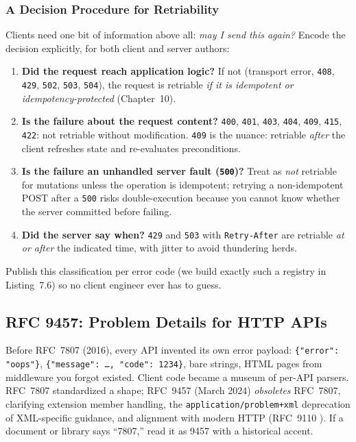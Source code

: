 \subsubsection{A Decision Procedure for Retriability}

Clients need one bit of information above all: \emph{may I send this again?}
Encode the decision explicitly, for both client and server authors:

\begin{enumerate}
  \item \textbf{Did the request reach application logic?} If not (transport
        error, \texttt{408}, \texttt{429}, \texttt{502}, \texttt{503},
        \texttt{504}), the request is retriable \emph{if it is idempotent or
        idempotency-protected} (Chapter~10).
  \item \textbf{Is the failure about the request content?} \texttt{400},
        \texttt{401}, \texttt{403}, \texttt{404}, \texttt{409}, \texttt{415},
        \texttt{422}: not retriable without modification. \texttt{409} is the
        nuance: retriable \emph{after} the client refreshes state and
        re-evaluates preconditions.
  \item \textbf{Is the failure an unhandled server fault (\texttt{500})?}
        Treat as \emph{not} retriable for mutations unless the operation is
        idempotent; retrying a non-idempotent POST after a \texttt{500} risks
        double-execution because you cannot know whether the server
        committed before failing.
  \item \textbf{Did the server say when?} \texttt{429} and \texttt{503} with
        \texttt{Retry-After} are retriable \emph{at or after} the indicated
        time, with jitter to avoid thundering herds.
\end{enumerate}

Publish this classification per error code (we build exactly such a registry
in Listing~7.6) so no client engineer ever has to guess.

\subsection{RFC 9457: Problem Details for HTTP APIs}

Before RFC~7807 (2016), every API invented its own error payload:
\texttt{\{"error": "oops"\}}, \texttt{\{"message": \ldots, "code": 1234\}},
bare strings, HTML pages from middleware you forgot existed. Client code
became a museum of per-API parsers. RFC~7807 standardized a shape; RFC~9457
(March 2024) \cite{rfc9457} \emph{obsoletes} RFC~7807, clarifying extension
member handling, the \texttt{application/problem+xml} deprecation of
XML-specific guidance, and alignment with modern HTTP (RFC~9110
\cite{rfc9110}). If a document or library says ``7807,'' read it as 9457
with a historical accent.

